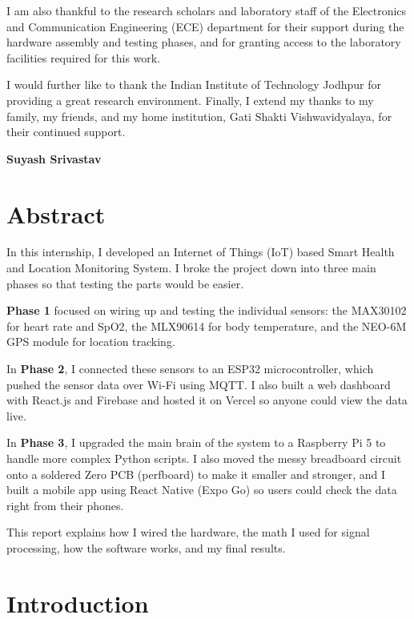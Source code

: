 \documentclass[12pt,a4paper,oneside]{report}
\begin{document}
I am also thankful to the research scholars and laboratory staff of the Electronics and Communication Engineering (ECE) department for their support during the hardware assembly and testing phases, and for granting access to the laboratory facilities required for this work.

I would further like to thank the Indian Institute of Technology Jodhpur for providing a great research environment. Finally, I extend my thanks to my family, my friends, and my home institution, Gati Shakti Vishwavidyalaya, for their continued support.

\vspace{1.5cm}
\noindent \textbf{Suyash Srivastav}

\chapter*{Abstract}
In this internship, I developed an Internet of Things (IoT) based Smart Health and Location Monitoring System. I broke the project down into three main phases so that testing the parts would be easier.

\textbf{Phase 1} focused on wiring up and testing the individual sensors: the MAX30102 for heart rate and SpO2, the MLX90614 for body temperature, and the NEO-6M GPS module for location tracking. 

In \textbf{Phase 2}, I connected these sensors to an ESP32 microcontroller, which pushed the sensor data over Wi-Fi using MQTT. I also built a web dashboard with React.js and Firebase and hosted it on Vercel so anyone could view the data live. 

In \textbf{Phase 3}, I upgraded the main brain of the system to a Raspberry Pi 5 to handle more complex Python scripts. I also moved the messy breadboard circuit onto a soldered Zero PCB (perfboard) to make it smaller and stronger, and I built a mobile app using React Native (Expo Go) so users could check the data right from their phones.

This report explains how I wired the hardware, the math I used for signal processing, how the software works, and my final results. 

\tableofcontents

\clearpage

\chapter{Introduction}
\end{document}
